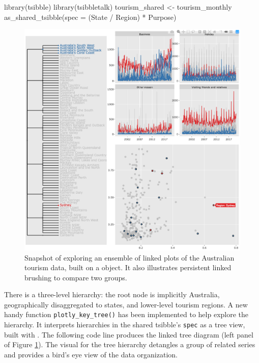 \begin{Schunk}
\begin{Sinput}
library(tsibble)
library(tsibbletalk)
tourism_shared <- tourism_monthly %
  as_shared_tsibble(spec = (State / Region) * Purpose)
\end{Sinput}
\end{Schunk}

\begin{Schunk}
\begin{figure}

{\centering \includegraphics[width=\textwidth]{img/tourism-linking} 

}

\caption[Snapshot of exploring an ensemble of linked plots of the Australian tourism data, built on a  object]{Snapshot of exploring an ensemble of linked plots of the Australian tourism data, built on a  object. It also illustrates persistent linked brushing to compare two groups.}\label{fig:tourism-linking-fig}
\end{figure}
\end{Schunk}

\noindent There is a three-level hierarchy: the root node is implicitly
Australia, geographically disaggregated to states, and lower-level
tourism regions. A new handy function \texttt{plotly\_key\_tree()} has
been implemented to help explore the hierarchy. It interprets
hierarchies in the shared tsibble's \texttt{spec} as a tree view, built
with . The following code line produces the linked tree
diagram (left panel of Figure \ref{fig:tourism-linking-fig}). The visual
for the tree hierarchy detangles a group of related series and provides
a bird's eye view of the data organization.

